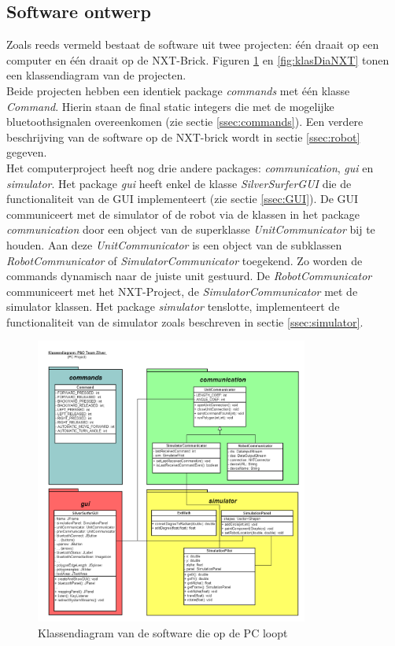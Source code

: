 \documentclass[tt1]{penoverslag}
\begin{document}
\subsection{Software ontwerp}
\label{ssec:Sdesign}
Zoals reeds vermeld bestaat de software uit twee projecten: \'e\'en draait op een computer en \'e\'en draait op de NXT-Brick. Figuren \ref{fig:klasDiaPC} en \ref{fig:klasDiaNXT} tonen een klassendiagram van de projecten.\\
Beide projecten hebben een identiek package \textit{commands} met \'e\'en klasse \textit{Command}. Hierin staan de final static integers die met de mogelijke bluetoothsignalen overeenkomen (zie sectie \ref{ssec:commands}). Een verdere beschrijving van de software op de NXT-brick wordt in sectie \ref{ssec:robot} gegeven.\\
Het computerproject heeft nog drie andere packages: \textit{communication}, \textit{gui} en \textit{simulator}. Het package \textit{gui} heeft enkel de klasse \textit{SilverSurferGUI} die de functionaliteit van de GUI implementeert (zie sectie \ref{ssec:GUI}). De GUI communiceert met de simulator of de robot via de klassen in het package \textit{communication} door een object van de superklasse \textit{UnitCommunicator} bij te houden. Aan deze \textit{UnitCommunicator} is een object van de subklassen \textit{RobotCommunicator} of \textit{SimulatorCommunicator}  toegekend. Zo worden de commands dynamisch naar de juiste unit gestuurd. De \textit{RobotCommunicator} communiceert met het NXT-Project, de \textit{SimulatorCommunicator} met de simulator klassen. Het package \textit{simulator} tenslotte, implementeert de functionaliteit van de simulator zoals beschreven in sectie \ref{ssec:simulator}.


\begin{figure}[tbp]
\begin{center}
    \includegraphics[width=0.8\textwidth]{KlassendiagramPC}
    \caption{Klassendiagram van de software die op de PC loopt}
	\label{fig:klasDiaPC}
\end{center}
\end{figure}
\end{document}
